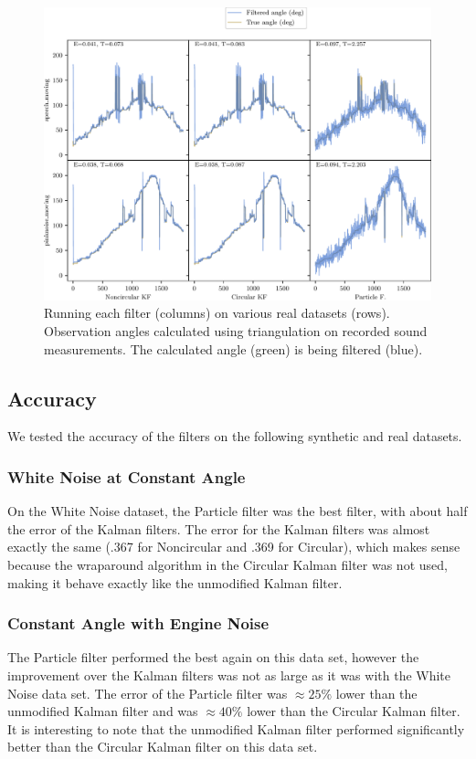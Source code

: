 \documentclass[11pt]{amsart}
\begin{document}
\begin{figure}[htp]
    \centering
    \includegraphics[width=.75\textwidth]{actual_paper_graphs/all_real.pdf}\hfill
    \caption{Running each filter (columns) on various real datasets (rows). Observation angles calculated using triangulation on recorded sound measurements. The calculated angle (green) is being filtered (blue).}
    \label{fig:all_real}
\end{figure}

\subsection{Accuracy}
We tested the accuracy of the filters on the following synthetic and real datasets.
\subsubsection{White Noise at Constant Angle}
On the White Noise dataset, the Particle filter was the best filter, with about half the error of the Kalman filters. The error for the Kalman filters was almost exactly the same (.367 for Noncircular and .369 for Circular), which makes sense because the wraparound algorithm in the Circular Kalman filter was not used, making it behave exactly like the unmodified Kalman filter.
\subsubsection{Constant Angle with Engine Noise}
The Particle filter performed the best again on this data set, however the improvement over the Kalman filters was not as large as it was with the White Noise data set. The error of the Particle filter was $\approx 25\%$ lower than the unmodified Kalman filter and was $\approx 40\%$ lower than the Circular Kalman filter. It is interesting to note that the unmodified Kalman filter performed significantly better than the Circular Kalman filter on this data set.
\end{document}

